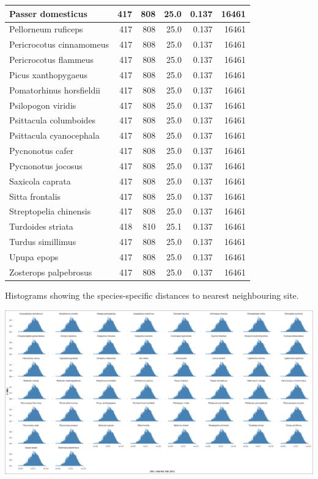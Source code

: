 \documentclass[]{article}
\begin{document}
\begin{tabular}{l|r|r|r|r|r}
\hline
Passer domesticus & 417 & 808 & 25.0 & 0.137 & 16461\\
\hline
Pellorneum ruficeps & 417 & 808 & 25.0 & 0.137 & 16461\\
\hline
Pericrocotus cinnamomeus & 417 & 808 & 25.0 & 0.137 & 16461\\
\hline
Pericrocotus flammeus & 417 & 808 & 25.0 & 0.137 & 16461\\
\hline
Picus xanthopygaeus & 417 & 808 & 25.0 & 0.137 & 16461\\
\hline
Pomatorhinus horsfieldii & 417 & 808 & 25.0 & 0.137 & 16461\\
\hline
Psilopogon viridis & 417 & 808 & 25.0 & 0.137 & 16461\\
\hline
Psittacula columboides & 417 & 808 & 25.0 & 0.137 & 16461\\
\hline
Psittacula cyanocephala & 417 & 808 & 25.0 & 0.137 & 16461\\
\hline
Pycnonotus cafer & 417 & 808 & 25.0 & 0.137 & 16461\\
\hline
Pycnonotus jocosus & 417 & 808 & 25.0 & 0.137 & 16461\\
\hline
Saxicola caprata & 417 & 808 & 25.0 & 0.137 & 16461\\
\hline
Sitta frontalis & 417 & 808 & 25.0 & 0.137 & 16461\\
\hline
Streptopelia chinensis & 417 & 808 & 25.0 & 0.137 & 16461\\
\hline
Turdoides striata & 418 & 810 & 25.1 & 0.137 & 16461\\
\hline
Turdus simillimus & 417 & 808 & 25.0 & 0.137 & 16461\\
\hline
Upupa epops & 417 & 808 & 25.0 & 0.137 & 16461\\
\hline
Zosterops palpebrosus & 417 & 808 & 25.0 & 0.137 & 16461\\
\hline
\end{tabular}

Histograms showing the species-specific distances to nearest neighbouring site.

\includegraphics{figs/fig_nnb_species.png}
\end{document}
